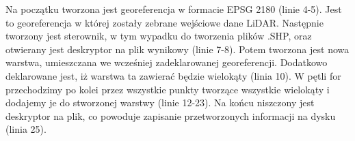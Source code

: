 Na początku tworzona jest georeferencja w formacie EPSG 2180 (linie 4-5). Jest to georeferencja w której zostały
zebrane wejściowe dane LiDAR. Następnie tworzony jest sterownik, w tym wypadku do tworzenia plików .SHP, oraz otwierany
jest deskryptor na plik wynikowy (linie 7-8). Potem tworzona jest nowa warstwa, umieszczana we wcześniej zadeklarowanej
georeferencji. Dodatkowo deklarowane jest, iż warstwa ta zawierać będzie wielokąty (linia 10). W pętli for przechodzimy po kolei
przez wszystkie punkty tworzące wszystkie wielokąty i dodajemy je do stworzonej warstwy (linie 12-23). Na końcu niszczony jest
deskryptor na plik, co powoduje zapisanie przetworzonych informacji na dysku (linia 25).
